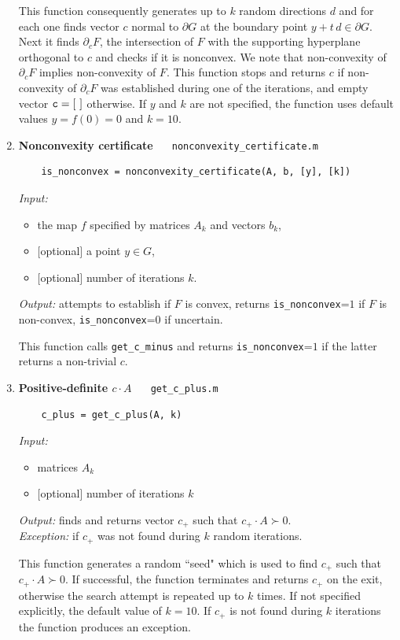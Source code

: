 \documentclass[a4paper]{article}
\theoremstyle{definition}
\begin{document}
\begin{enumerate}
	This function consequently generates up to $k$ random directions $d$ and for each one finds vector $c$ normal to $\partial G$ at the boundary point $y+t\, d\in \partial G$.  Next it finds $\partial_c F$, the intersection of $F$ with the supporting hyperplane orthogonal to $c$ and checks if it is nonconvex.  We note that non-convexity of $\partial_c F$ implies non-convexity of $F$. This function stops and returns $c$ if non-convexity of $\partial_c F$ was established during one of the iterations, and empty vector ${\tt c=[\ ]}$ otherwise. 
If $y$ and $k$ are not specified, the function uses default values $y=f(0)=0$ and $k=10$.


\item {\bf Nonconvexity certificate\ \ \  }{\tt nonconvexity\_certificate.m} 
	\begin{verbatim}
	is_nonconvex = nonconvexity_certificate(A, b, [y], [k])
	\end{verbatim}
{\it Input:}
\begin{itemize}
	\item the map $f$ specified by matrices $A_k$ and vectors $b_k$,
	\item  $[$optional$]$ a point $y\in G$,
	\item $[$optional$]$ number of iterations $k$.
\end{itemize}
{\it Output:} attempts to establish if $F$ is convex, returns {\tt is\_nonconvex}=$1$ if $F$ is non-convex,  {\tt is\_nonconvex}=$0$ if uncertain.

	
	This function calls {\tt get\_c\_minus} and returns  {\tt is\_nonconvex}=$1$ if the latter returns a non-trivial $c$. 


\item {\bf Positive-definite $c\cdot A$\ \ \ }{\tt get\_c\_plus.m}
\begin{verbatim}
	c_plus = get_c_plus(A, k)
\end{verbatim}

{\it Input:}
\begin{itemize}
	\item matrices $A_k$
	\item $[$optional$]$ number of iterations $k$
\end{itemize}
{\it Output:} finds and returns vector $c_+$ such that $c_+\cdot A\succ 0$.\\
{\it Exception:} if $c_+$  was not found during $k$ random iterations.

	
	This function generates a random ``seed" which is used to find $c_+$ such that $c_+\cdot A\succ 0$. If successful, the function terminates and returns $c_+$ on the exit, otherwise the search attempt is repeated up to $k$ times. If not specified explicitly, the default value of $k=10$. If $c_+$ is not found during $k$ iterations the function produces an exception. 
	

\end{enumerate}
\end{document}

